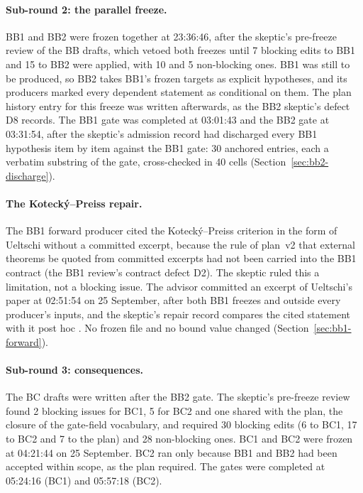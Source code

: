 \paragraph{Sub-round 2: the parallel freeze.} BB1 and BB2 were frozen
together at 23:36:46, after the skeptic's pre-freeze review of the BB drafts,
which vetoed both freezes until 7 blocking edits to BB1 and 15 to BB2 were
applied, with 10 and 5 non-blocking ones. BB1 was still to be produced, so
BB2 takes BB1's frozen targets as explicit hypotheses, and its producers
marked every dependent statement as conditional on them. The plan history
entry for this freeze was written afterwards, as the BB2 skeptic's defect D8
records. The BB1 gate was completed at 03:01:43 and the BB2 gate at 03:31:54,
after the skeptic's admission record had discharged every BB1 hypothesis item
by item against the BB1 gate: 30 anchored entries, each a verbatim substring
of the gate, cross-checked in 40 cells (Section~\ref{sec:bb2-discharge}).

\paragraph{The Kotecký--Preiss repair.} The BB1 forward producer cited the
Kotecký--Preiss criterion \cite{kp} in the form of Ueltschi \cite{ueltschi}
without a committed excerpt, because the rule of plan~v2 that external
theorems be quoted from committed excerpts had not been carried into the BB1
contract (the BB1 review's contract defect D2). The skeptic ruled this a
limitation, not a blocking issue. The advisor committed an excerpt of
Ueltschi's paper at 02:51:54 on 25 September, after both BB1 freezes and
outside every producer's inputs, and the skeptic's repair record compares the
cited statement with it post hoc \cite{r33skeptic}. No frozen file and no
bound value changed (Section~\ref{sec:bb1-forward}).

\paragraph{Sub-round 3: consequences.} The BC drafts were written after the
BB2 gate. The skeptic's pre-freeze review found 2 blocking issues for BC1, 5
for BC2 and one shared with the plan, the closure of the gate-field
vocabulary, and required 30 blocking edits (6 to BC1, 17 to BC2 and 7 to the
plan) and 28 non-blocking ones. BC1 and BC2 were frozen at 04:21:44 on 25
September. BC2 ran only because BB1 and BB2 had been accepted within scope,
as the plan required. The gates were completed at 05:24:16 (BC1) and 05:57:18
(BC2).

